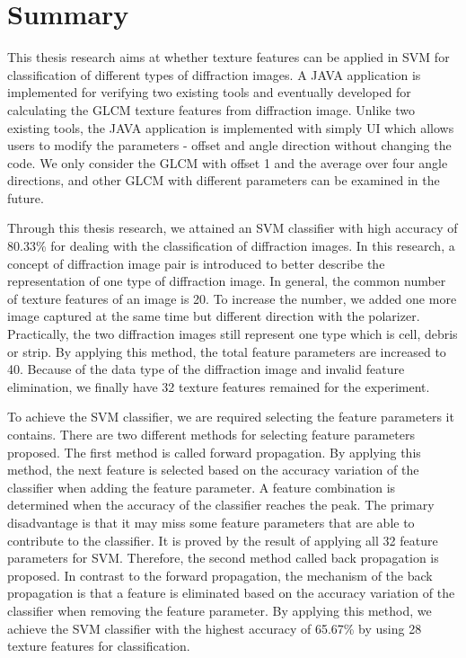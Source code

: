 
\renewcommand{\thechapter}{4}

\chapter{Summary}
This thesis research aims at whether texture features can be applied in SVM for classification of different types of diffraction images. A JAVA application is implemented for verifying two existing tools and eventually developed for calculating the GLCM texture features from diffraction image. Unlike two existing tools, the JAVA application is implemented with simply UI which allows users to modify the parameters - offset and angle direction without changing the code. We only consider the GLCM with offset 1 and the average over four angle directions, and other GLCM with different parameters can be examined in the future.\par  
Through this thesis research, we attained an SVM classifier with high accuracy of 80.33\% for dealing with the classification of diffraction images. In this research, a concept of diffraction image pair is introduced to better describe the representation of one type of diffraction image. In general, the common number of texture features of an image is 20. To increase the number, we added one more image captured at the same time but different direction with the polarizer. Practically, the two diffraction images still represent one type which is cell, debris or strip. By applying this method, the total feature parameters are increased to 40. Because of the data type of the diffraction image and invalid feature elimination, we finally have 32 texture features remained for the experiment. \par
To achieve the SVM classifier, we are required selecting the feature parameters it contains. There are two different methods for selecting feature parameters proposed. The first method is called forward propagation. By applying this method, the next feature is selected based on the accuracy variation of the classifier when adding the feature parameter. A feature combination is determined when the accuracy of the classifier reaches the peak. The primary disadvantage is that it may miss some feature parameters that are able to contribute to the classifier. It is proved by the result of applying all 32 feature parameters for SVM. Therefore, the second method called back propagation is proposed. In contrast to the forward propagation, the mechanism of the back propagation is that a feature is eliminated based on the accuracy variation of the classifier when removing the feature parameter. By applying this method, we achieve the SVM classifier with the highest accuracy of 65.67\% by using 28 texture features for classification.\par   
